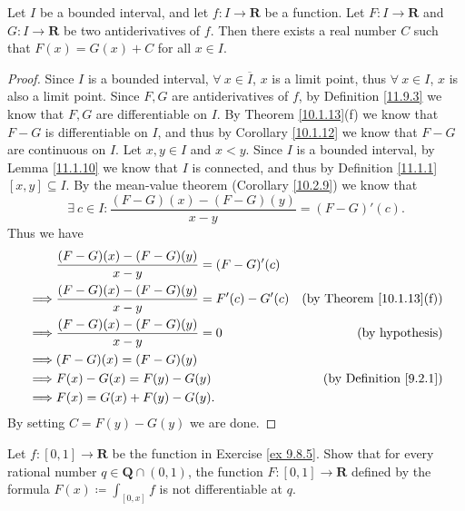 \begin{lemma}\label{11.9.5}
    Let \(I\) be a bounded interval, and let \(f : I \to \mathbf{R}\) be a function.
    Let \(F : I \to \mathbf{R}\) and \(G : I \to \mathbf{R}\) be two antiderivatives of \(f\).
    Then there exists a real number \(C\) such that \(F(x) = G(x) + C\) for all \(x \in I\).
\end{lemma}

\begin{proof}
    Since \(I\) is a bounded interval, \(\forall\ x \in \overline{I}\), \(x\) is a limit point, thus \(\forall\ x \in I\), \(x\) is also a limit point.
    Since \(F, G\) are antiderivatives of \(f\), by Definition \ref{11.9.3} we know that \(F, G\) are differentiable on \(I\).
    By Theorem \ref{10.1.13}(f) we know that \(F - G\) is differentiable on \(I\), and thus by Corollary \ref{10.1.12} we know that \(F - G\) are continuous on \(I\).
    Let \(x, y \in I\) and \(x < y\).
    Since \(I\) is a bounded interval, by Lemma \ref{11.1.10} we know that \(I\) is connected, and thus by Definition \ref{11.1.1} \([x, y] \subseteq I\).
    By the mean-value theorem (Corollary \ref{10.2.9}) we know that
    \[
        \exists\ c \in I : \frac{(F - G)(x) - (F - G)(y)}{x - y} = (F - G)'(c).
    \]
    Thus we have
    \begin{align*}
                 & \frac{(F - G)(x) - (F - G)(y)}{x - y} = (F - G)'(c)                                          \\
        \implies & \frac{(F - G)(x) - (F - G)(y)}{x - y} = F'(c) - G'(c) & \text{(by Theorem \ref{10.1.13}(f))} \\
        \implies & \frac{(F - G)(x) - (F - G)(y)}{x - y} = 0             & \text{(by hypothesis)}               \\
        \implies & (F - G)(x) = (F - G)(y)                                                                      \\
        \implies & F(x) - G(x) = F(y) - G(y)                             & \text{(by Definition \ref{9.2.1})}   \\
        \implies & F(x) = G(x) + F(y) - G(y).
    \end{align*}
    By setting \(C = F(y) - G(y)\) we are done.
\end{proof}

\exercisesection

\begin{exercise}\label{ex 11.9.1}
    Let \(f : [0, 1] \to \mathbf{R}\) be the function in Exercise \ref{ex 9.8.5}.
    Show that for every rational number \(q \in \mathbf{Q} \cap (0, 1)\), the function \(F : [0, 1] \to \mathbf{R}\) defined by the formula \(F(x) \coloneqq \int_{[0, x]} f\) is not differentiable at \(q\).
\end{exercise}

